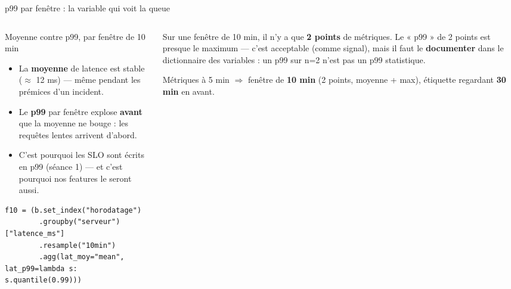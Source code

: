 \begin{frame}[fragile]{p99 par fenêtre : la variable qui voit la queue}
\begin{columns}[t]
\begin{column}{0.52\textwidth}
\begin{block}{Moyenne contre p99, par fenêtre de 10 min}
\begin{itemize}
\item La \textbf{moyenne} de latence est stable ($\approx$ 12 ms) --- même
pendant les prémices d'un incident.
\item Le \textbf{p99} par fenêtre explose \textbf{avant} que la moyenne ne
bouge : les requêtes lentes arrivent d'abord.
\item C'est pourquoi les SLO sont écrits en p99 (séance 1) --- et c'est
pourquoi nos features le seront aussi.
\end{itemize}
\end{block}
\begin{codebox}
\begin{lstlisting}
f10 = (b.set_index("horodatage")
        .groupby("serveur")["latence_ms"]
        .resample("10min")
        .agg(lat_moy="mean", lat_p99=lambda s: s.quantile(0.99)))
\end{lstlisting}
\end{codebox}
\end{column}
\begin{column}{0.44\textwidth}
\begin{wbox}
Sur une fenêtre de 10 min, il n'y a que \textbf{2 points} de métriques.
Le « p99 » de 2 points est presque le maximum --- c'est acceptable
(comme signal), mais il faut le \textbf{documenter} dans le dictionnaire
des variables : un p99 sur n=2 n'est pas un p99 statistique.
\end{wbox}
\begin{ebox}
Métriques à 5 min $\Rightarrow$ fenêtre de \textbf{10 min} (2 points,
moyenne + max), étiquette regardant \textbf{30 min} en avant.
\end{ebox}
\end{column}
\end{columns}
\end{frame}

